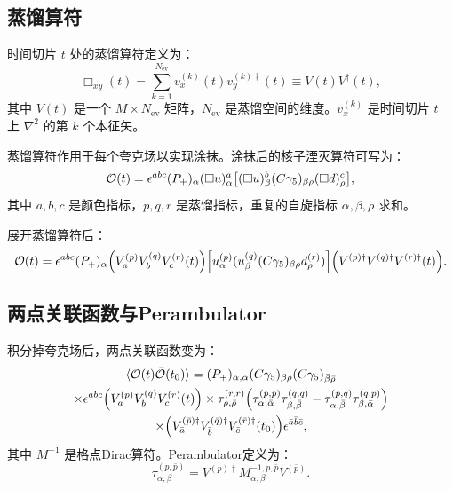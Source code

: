 \documentclass[11pt,a4paper]{article}
\begin{document}
\subsection{蒸馏算符}

时间切片 $t$ 处的蒸馏算符定义为\cite{Peardon:2009gh}：
\begin{equation}\label{eq:distillation}
    \Box_{xy}(t) = \sum_{k=1}^{N_{\text{ev}}} v^{(k)}_x(t) v^{(k)\dagger}_y(t) \equiv V(t) V^\dagger(t),
\end{equation}
其中 $V(t)$ 是一个 $M \times N_{\text{ev}}$ 矩阵，$N_{\text{ev}}$ 是蒸馏空间的维度。$v^{(k)}_x$ 是时间切片 $t$ 上 $\nabla^2$ 的第 $k$ 个本征矢。

蒸馏算符作用于每个夸克场以实现涂抹。涂抹后的核子湮灭算符可写为：
\begin{equation}\label{eq:nucleon_dist}
    \mathcal{O}(t) = \epsilon^{abc} (P_+)_\alpha (\Box u)^a_\alpha \qty[(\Box u)^b_\beta (C\gamma_5)_{\beta\rho} (\Box d)^c_\rho],
\end{equation}
其中 $a,b,c$ 是颜色指标，$p,q,r$ 是蒸馏指标，重复的自旋指标 $\alpha,\beta,\rho$ 求和。

展开蒸馏算符后：
\begin{equation}\label{eq:nucleon_dist_expanded}
    \mathcal{O}(t) = \epsilon^{abc} (P_+)_\alpha \qty(V^{(p)}_a V^{(q)}_b V^{(r)}_c(t)) \qty[u^{(p)}_\alpha (u^{(q)}_\beta (C\gamma_5)_{\beta\rho} d^{(r)}_\rho)] \qty(V^{(p)\dagger} V^{(q)\dagger} V^{(r)\dagger}(t)).
\end{equation}

\subsection{两点关联函数与Perambulator}

积分掉夸克场后，两点关联函数变为：
\begin{multline}\label{eq:C2pt_dist}
    \langle \mathcal{O}(t) \bar{\mathcal{O}}(t_0) \rangle = (P_+)_{\alpha,\bar{\alpha}} (C\gamma_5)_{\beta\rho} (C\gamma_5)_{\bar{\beta}\bar{\rho}} \\
    \times \epsilon^{abc} \qty(V^{(p)}_a V^{(q)}_b V^{(r)}_c(t))
    \times \tau^{(r,\bar{r})}_{\rho,\bar{\rho}} \qty(\tau^{(p,\bar{p})}_{\alpha,\bar{\alpha}} \tau^{(q,\bar{q})}_{\beta,\bar{\beta}} - \tau^{(p,\bar{q})}_{\alpha,\bar{\beta}} \tau^{(q,\bar{p})}_{\beta,\bar{\alpha}}) \\
    \times \qty(V^{(\bar{p})\dagger}_{\bar{a}} V^{(\bar{q})\dagger}_{\bar{b}} V^{(\bar{r})\dagger}_{\bar{c}}(t_0)) \epsilon^{\bar{a}\bar{b}\bar{c}},
\end{multline}
其中 $M^{-1}$ 是格点Dirac算符。Perambulator定义为：
\begin{equation}\label{eq:perambulator}
    \tau^{(p,\bar{p})}_{\alpha,\beta} = V^{(p)\dagger} M^{-1,p,\bar{p}}_{\alpha,\beta} V^{(\bar{p})}.
\end{equation}
\end{document}
